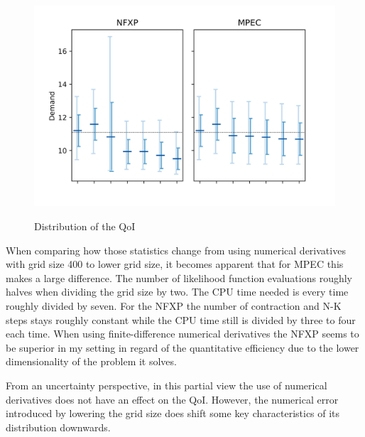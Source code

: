 \begin{figure}[!b]
	\caption{Distribution of the QoI}
	\vspace*{-4mm}
	\centering
	\includegraphics[scale=0.9]{../figures/figure_9.png}
	\label{figure9}
\end{figure}

When comparing how those statistics change from using numerical derivatives with grid size 400 to lower grid size, it becomes apparent that for MPEC this makes a large difference. The number of likelihood function evaluations roughly halves when dividing the grid size by two. The CPU time needed is every time roughly divided by seven. For the NFXP the number of contraction and N-K steps stays roughly constant while the CPU time still is divided by three to four each time. When using finite-difference numerical derivatives the NFXP seems to be superior in my setting in regard of the quantitative efficiency due to the lower dimensionality of the problem it solves.

From an uncertainty perspective, in this partial view the use of numerical derivatives does not have an effect on the QoI. However, the numerical error introduced by lowering the grid size does shift some key characteristics of its distribution downwards.

